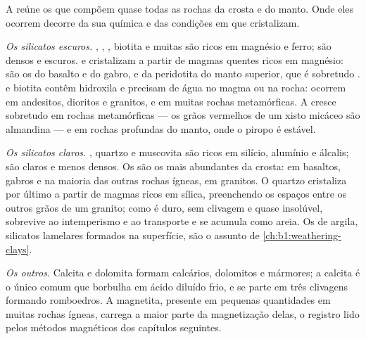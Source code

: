 A  reúne os  que compõem quase todas as rochas da crosta e do manto. Onde eles ocorrem decorre da sua química e das condições em que cristalizam.

\emph{Os silicatos escuros.} , , , biotita e muitas  são ricos em magnésio e ferro; são densos e escuros.  e  cristalizam a partir de magmas quentes ricos em magnésio: são os  do basalto e do gabro, e da peridotita do manto superior, que é sobretudo .  e biotita contêm hidroxila e precisam de água no magma ou na rocha: ocorrem em andesitos, dioritos e granitos, e em muitas rochas metamórficas. A  cresce sobretudo em rochas metamórficas --- os grãos vermelhos de um xisto micáceo são almandina --- e em rochas profundas do manto, onde o piropo é estável.

\emph{Os silicatos claros.} , quartzo e muscovita são ricos em silício, alumínio e álcalis; são claros e menos densos. Os  são os  mais abundantes da crosta:  em basaltos, gabros e na maioria das outras rochas ígneas,  em granitos. O quartzo cristaliza por último a partir de magmas ricos em sílica, preenchendo os espaços entre os outros grãos de um granito; como é duro, sem clivagem e quase insolúvel, sobrevive ao intemperismo e ao transporte e se acumula como areia. Os  de argila, silicatos lamelares formados na superfície, são o assunto de \cref{ch:b1:weathering-clays}.

\emph{Os outros.} Calcita e dolomita formam calcários, dolomitos e mármores; a calcita é o único  comum que borbulha em ácido diluído frio, e se parte em três clivagens formando romboedros. A magnetita, presente em pequenas quantidades em muitas rochas ígneas, carrega a maior parte da magnetização delas, o registro lido pelos métodos magnéticos dos capítulos seguintes.


